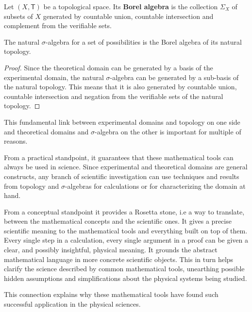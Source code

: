 \documentclass[11pt,letterpaper,fleqn]{memoir} %
\begin{document}
\begin{mathSection}
	
	\begin{defn}
		Let $(X, \mathsf{T})$ be a topological space. Its \textbf{Borel algebra} is the collection $\Sigma_X$ of subsets of $X$ generated by countable union, countable intersection and complement from the verifiable sets.
	\end{defn}
	
	\begin{prop}
		The natural $\sigma$-algebra for a set of possibilities is the Borel algebra of its natural topology.
	\end{prop}
	
	\begin{proof}
		Since the theoretical domain can be generated by a basis of the experimental domain, the natural $\sigma$-algebra can be generated by a sub-basis of the natural topology. This means that it is also generated by countable union, countable intersection and negation from the verifiable sets of the natural topology.
	\end{proof}
\end{mathSection}

This fundamental link between experimental domains and topology on one side and theoretical domains and $\sigma$-algebra on the other is important for multiple of reasons.

From a practical standpoint, it guarantees that these mathematical tools can always be used in science. Since experimental and theoretical domains are general constructs, any branch of scientific investigation can use techniques and results from topology and $\sigma$-algebras for calculations or for characterizing the domain at hand.

From a conceptual standpoint it provides a Rosetta stone, i.e a way to translate, between the mathematical concepts and the scientific ones. It gives a precise scientific meaning to the mathematical tools and everything built on top of them. Every single step in a calculation, every single argument in a proof can be given a clear, and possibly insightful, physical meaning. It grounds the abstract mathematical language in more concrete scientific objects. This in turn helps clarify the science described by common mathematical tools, unearthing possible hidden assumptions and simplifications about the physical systems being studied.

This connection explains why these mathematical tools have found such successful application in the physical sciences.
\end{document}
